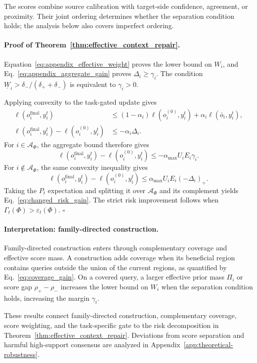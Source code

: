 The scores combine source calibration with target-side confidence, agreement,
or proximity.  Their joint ordering determines whether the separation
condition holds; the analysis below also covers imperfect ordering.

\paragraph{Proof of Theorem~\ref{thm:effective_context_repair}.}

Equation~\eqref{eq:appendix_effective_weight} proves the lower bound on
$W_i$, and Eq.~\eqref{eq:appendix_aggregate_gain} proves
$\Delta_i\geq\gamma_i$.  The condition
$\underline W_i>\delta_-/(\delta_++\delta_-)$ is equivalent to
$\gamma_i>0$.

Applying convexity to the task-gated update gives
\[
\begin{aligned}
\ell(o_i^{\mathrm{final}},y_i^t)
&\leq(1-\alpha_i)\ell(o_i^{(0)},y_i^t)
+\alpha_i\ell(\bar o_i,y_i^t),\\
\ell(o_i^{\mathrm{final}},y_i^t)-\ell(o_i^{(0)},y_i^t)
&\leq-\alpha_i\Delta_i.
\end{aligned}
\]
For $i\in\mathcal A_\Phi$, the aggregate bound therefore gives
\[
\ell(o_i^{\mathrm{final}},y_i^t)-\ell(o_i^{(0)},y_i^t)
\leq-\alpha_{\max}U_iE_i\gamma_i.
\]
For $i\notin\mathcal A_\Phi$, the same convexity inequality gives
\[
\ell(o_i^{\mathrm{final}},y_i^t)-\ell(o_i^{(0)},y_i^t)
\leq\alpha_{\max}U_iE_i(-\Delta_i)_+.
\]
Taking the $P_t$ expectation and splitting it over
$\mathcal A_\Phi$ and its complement yields
Eq.~\eqref{eq:changed_risk_gain}.  The strict risk improvement follows when
$\Gamma_t(\Phi)>\varepsilon_t(\Phi)$. \hfill$\square$

\paragraph{Interpretation: family-directed construction.}
\label{app:family-construction}

Family-directed construction enters through complementary coverage and
effective score mass. A construction adds coverage when its beneficial region
contains queries outside the union of the current regions, as quantified by
Eq.~\eqref{eq:coverage_gain}.  On a covered query, a larger effective prior
mass $\Pi_i$ or score gap $\rho_+-\rho_-$ increases the lower bound on
$W_i$ when the separation condition holds, increasing the margin $\gamma_i$.

These results connect family-directed construction, complementary coverage,
score weighting, and the task-specific gate to the risk decomposition in
Theorem~\ref{thm:effective_context_repair}. Deviations from score
separation and harmful high-support consensus are analyzed in
Appendix~\ref{app:theoretical-robustness}.

